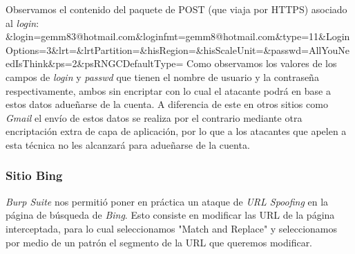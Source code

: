 \documentclass[10pt,a4paper]{article}
\begin{document}
Observamos el contenido del paquete de POST (que viaja por HTTPS) asociado al \textit{login}:
\newline
\newline
\&login=gemm83@hotmail.com\newline\&loginfmt=gemm8@hotmail.com\newline\&type=11\newline\&LoginOptions=3\newline\&lrt=\newline\&lrtPartition=\newline\&hisRegion=\newline\&hisScaleUnit=\newline\&passwd=AllYouNeedIsThink\newline\&ps=2\newline\&psRNGCDefaultType=
\newline\newline
Como observamos los valores de los campos de \textit{login} y \textit{passwd} que tienen el nombre de usuario y la contraseña respectivamente, ambos sin encriptar con lo cual el atacante podrá en base a estos datos adueñarse de la cuenta.
A diferencia de este en otros sitios como \textit{Gmail} el envío de estos datos se realiza por el contrario mediante otra encriptación extra de capa de aplicación, por lo que a los atacantes que apelen a esta técnica no les alcanzará para adueñarse de la cuenta.



\subsubsection{Sitio Bing}

\textit{Burp Suite} nos permitió poner en práctica un ataque de \textit{URL Spoofing} en la página de búsqueda de \textit{Bing}. Esto consiste en modificar las URL de la página interceptada, para lo cual seleccionamos "Match and Replace" y seleccionamos por medio de un patrón el segmento de la URL que queremos modificar.
\end{document}
